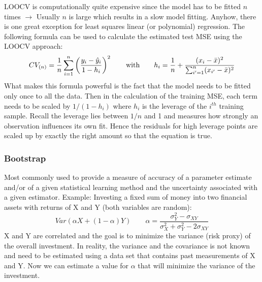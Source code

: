 {LOOCV is computationally quite expensive since the model has to be fitted $n$ times $\rightarrow$ Usually $n$ is large which results in a slow model fitting.
Anyhow, there is one great exception for least squares linear (or polynomial) regression.
The following formula can be used to calculate the estimated test MSE using the LOOCV approach:
\[ CV_{(n)}=\frac{1}{n} \sum_{i=1}^{n} \left( \frac{y_i-\hat{y}_i}{1-h_i} \right)^2 \qquad \text{with} \qquad
h_i= \frac{1}{n}+ \frac{(x_i-\bar{x})^2}{\sum_{i'=1}^{n}(x_{i'}-\bar{x})^2} \]
What makes this formula powerful is the fact that the model needs to be fitted only once to all the data.
Then in the calculation of the training MSE, each term needs to be scaled by $1/(1-h_i)$ where $h_i$ is the leverage of the $i^{th}$ training sample.
Recall the leverage lies between $1/n$ and 1 and measures how strongly an observation influences its own fit.
Hence the residuals for high leverage points are scaled up by exactly the right amount so that the equation is true.

\subsubsection{Bootstrap}
Most commonly used to provide a measure of accuracy of a parameter estimate and/or of a given statistical learning method and the uncertainty associated with a given estimator.
Example: Investing a fixed sum of money into two financial assets with returns of X and Y (both variables are random):
\[ Var(\alpha X+(1-\alpha)Y) \qquad \alpha =\frac{\sigma_Y^2-\sigma_{XY}}{\sigma_X^2+\sigma_Y^2-2\sigma_{XY}}\]
X and Y are correlated and the goal is to minimize the variance (risk proxy) of the overall investment.
In reality, the variance and the covariance is not known and need to be estimated using a data set that contains past measurements of X and Y.
Now we can estimate a value for $\alpha$ that will minimize the variance of the investment.

}
